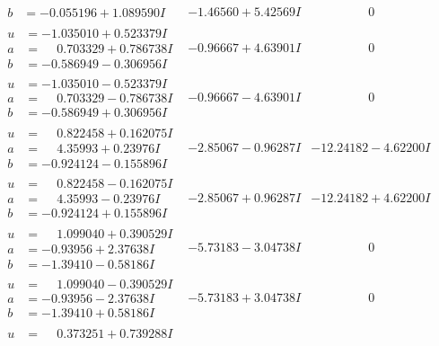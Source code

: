 \documentclass[1p]{elsarticle_modified}
\theoremstyle{definition}
\begin{document}
$$\begin{array}{c|c|c}
\begin{aligned}
b &= -0.055196 + 1.089590 I\end{aligned}
 & -1.46560 + 5.42569 I & \phantom{-0.000000 } 0 \\ \hline\begin{aligned}
u &= -1.035010 + 0.523379 I \\
a &= \phantom{-}0.703329 + 0.786738 I \\
b &= -0.586949 - 0.306956 I\end{aligned}
 & -0.96667 + 4.63901 I & \phantom{-0.000000 } 0 \\ \hline\begin{aligned}
u &= -1.035010 - 0.523379 I \\
a &= \phantom{-}0.703329 - 0.786738 I \\
b &= -0.586949 + 0.306956 I\end{aligned}
 & -0.96667 - 4.63901 I & \phantom{-0.000000 } 0 \\ \hline\begin{aligned}
u &= \phantom{-}0.822458 + 0.162075 I \\
a &= \phantom{-}4.35993 + 0.23976 I \\
b &= -0.924124 - 0.155896 I\end{aligned}
 & -2.85067 - 0.96287 I & -12.24182 - 4.62200 I \\ \hline\begin{aligned}
u &= \phantom{-}0.822458 - 0.162075 I \\
a &= \phantom{-}4.35993 - 0.23976 I \\
b &= -0.924124 + 0.155896 I\end{aligned}
 & -2.85067 + 0.96287 I & -12.24182 + 4.62200 I \\ \hline\begin{aligned}
u &= \phantom{-}1.099040 + 0.390529 I \\
a &= -0.93956 + 2.37638 I \\
b &= -1.39410 - 0.58186 I\end{aligned}
 & -5.73183 - 3.04738 I & \phantom{-0.000000 } 0 \\ \hline\begin{aligned}
u &= \phantom{-}1.099040 - 0.390529 I \\
a &= -0.93956 - 2.37638 I \\
b &= -1.39410 + 0.58186 I\end{aligned}
 & -5.73183 + 3.04738 I & \phantom{-0.000000 } 0 \\ \hline\begin{aligned}
u &= \phantom{-}0.373251 + 0.739288 I \\

\end{aligned}
\end{array}$$
\end{document}
